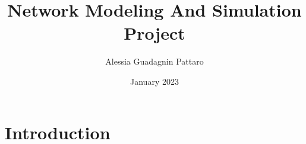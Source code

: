 \documentclass{article}
\title{Network Modeling And Simulation Project}
\author{Alessia Guadagnin Pattaro}
\date{January 2023}
\begin{document}
\maketitle

\section{Introduction}
\end{document}

